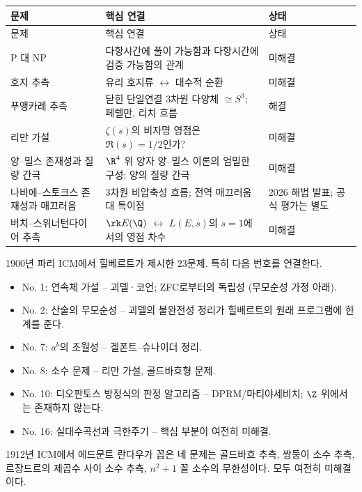 \begin{center}
\small
\renewcommand{\arraystretch}{1.08}
\begin{longtable}{@{}L{0.31\textwidth}L{0.47\textwidth}L{0.14\textwidth}@{}}
\toprule
문제 & 핵심 연결 & 상태\\
\midrule
\endfirsthead
\toprule 문제 & 핵심 연결 & 상태\\ \midrule \endhead
\bottomrule\endlastfoot
P 대 NP & 다항시간에 풀이 가능함과 다항시간에 검증 가능함의 관계 & 미해결\\
호지 추측 & 유리 호지류 $\leftrightarrow$ 대수적 순환 & 미해결\\
푸앵카레 추측 & 닫힌 단일연결 $3$차원 다양체 $\cong S^3$; 페렐만, 리치 흐름 & 해결\\
리만 가설 & $\zeta(s)$의 비자명 영점은 $\Re(s)=1/2$인가? & 미해결\\
양--밀스 존재성과 질량 간극 & $\R^4$ 위 양자 양--밀스 이론의 엄밀한 구성; 양의 질량 간극 & 미해결\\
나비에--스토크스 존재성과 매끄러움 & 3차원 비압축성 흐름; 전역 매끄러움 대 특이점 & 2026 해법 발표; 공식 평가는 별도\\
버치--스위너턴다이어 추측 & $\rk E(\Q)$ $\leftrightarrow$ $L(E,s)$의 $s=1$에서의 영점 차수 & 미해결\\
\end{longtable}
\end{center}


1900년 파리 ICM에서 힐베르트가 제시한 23문제. 특히 다음 번호를 연결한다.
\begin{itemize}
\item No. 1: 연속체 가설 -- 괴델·코언; ZFC로부터의 독립성 (무모순성 가정 아래).
\item No. 2: 산술의 무모순성 -- 괴델의 불완전성 정리가 힐베르트의 원래 프로그램에 한계를 준다.
\item No. 7: $a^b$의 초월성 -- 겔폰트--슈나이더 정리.
\item No. 8: 소수 문제 -- 리만 가설, 골드바흐형 문제.
\item No. 10: 디오판토스 방정식의 판정 알고리즘 -- DPRM/마티야세비치; $\Z$ 위에서는 존재하지 않는다.
\item No. 16: 실대수곡선과 극한주기 -- 핵심 부분이 여전히 미해결.
\end{itemize}


1912년 ICM에서 에드문트 란다우가 꼽은 네 문제는 골드바흐 추측, 쌍둥이 소수 추측, 르장드르의 제곱수 사이 소수 추측, $n^2+1$ 꼴 소수의 무한성이다. 모두 여전히 미해결이다.

